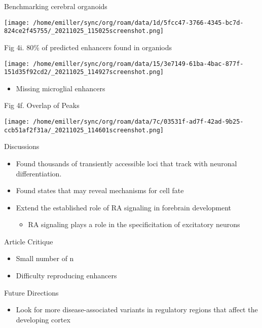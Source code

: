 \documentclass[bigger]{beamer}
\begin{document}
\begin{frame}[label={sec:orgc0fd990}]{Benchmarking cerebral organoids}
\begin{center}
\texttt{[image: /home/emiller/sync/org/roam/data/1d/5fcc47-3766-4345-bc7d-824ce2f45755/\_20211025\_115025screenshot.png]}
\end{center}
\end{frame}


\begin{frame}[label={sec:orgff0fc54}]{Fig 4i. 80\% of predicted enhancers found in organiods}
\begin{center}
\texttt{[image: /home/emiller/sync/org/roam/data/15/3e7149-61ba-4bac-877f-151d35f92cd2/\_20211025\_114927screenshot.png]}
\end{center}

\begin{itemize}
\item Missing microglial enhancers
\end{itemize}
\end{frame}

\begin{frame}[label={sec:orgc1f3e16}]{Fig 4f. Overlap of Peaks}
\begin{center}
\texttt{[image: /home/emiller/sync/org/roam/data/7c/03531f-ad7f-42ad-9b25-ccb51af2f31a/\_20211025\_114601screenshot.png]}
\end{center}
\end{frame}

\begin{frame}[label={sec:org7d40b67}]{Discussions}
\begin{itemize}
\item Found thousands of transiently accessible loci that track with neuronal
differentiation.
\item Found states that may reveal mechanisms for cell fate
\item Extend the established role of RA signaling in forebrain development
\begin{itemize}
\item RA signaling plays a role in the specificitation of excitatory neurons
\end{itemize}
\end{itemize}
\end{frame}

\begin{frame}[label={sec:org4767823}]{Article Critique}
\begin{itemize}
\item Small number of n
\item Difficulty reproducing enhancers
\end{itemize}
\end{frame}

\begin{frame}[label={sec:orgc55dd5c}]{Future Directions}
\begin{itemize}
\item Look for more disease-associated variants in regulatory regions that affect
the developing cortex
\end{itemize}
\end{frame}
\end{document}

